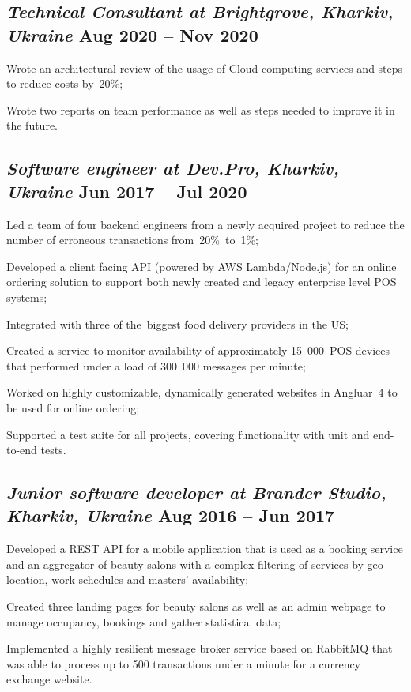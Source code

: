 \documentclass[a4paper,12pt]{book}
\begin{document}
\subsection{{\sl\bf\hspace{0.1in}Technical Consultant at Brightgrove, Kharkiv, Ukraine } \hfill Aug 2020 -- Nov 2020}
\begin{zitemize}
 \item Wrote an architectural review of the usage of Cloud computing services and steps to reduce costs by~20\%;
 \item Wrote two reports on team performance as well as steps needed to improve it in the future.
\end{zitemize}

\subsection{{\sl\bf\hspace{0.1in}Software engineer at Dev.Pro, Kharkiv, Ukraine} \hfill Jun 2017 -- Jul 2020}
\begin{zitemize}
 \item Led a team of four backend engineers from a newly acquired project to reduce the number of erroneous transactions from~20\%~to~1\%;
 \item Developed a client facing API (powered by AWS Lambda/Node.js) for an online ordering solution to support both newly created and legacy enterprise level POS systems;
 \item Integrated with three of the~biggest food delivery providers in the US;
 \item Created a service to monitor availability of approximately 15~000~POS devices that performed under a load of 300~000 messages per minute;
 \item Worked on highly customizable, dynamically generated websites in Angluar~4 to be used for online ordering;
 \item Supported a test suite for all projects, covering functionality with unit and end-to-end tests.
\end{zitemize}

\subsection{{\sl\bf\hspace{0.1in} Junior software developer at Brander Studio, Kharkiv, Ukraine} \hfill Aug 2016 -- Jun 2017}
\begin{zitemize}
 \item Developed a REST API for a mobile application that is used as a booking service and an aggregator of beauty salons with a complex filtering of services by geo location, work schedules and masters' availability;
 \item Created three landing pages for beauty salons as well as an admin webpage to manage occupancy, bookings and gather statistical data;
 \item Implemented a highly resilient message broker service based on RabbitMQ that was able to process up to 500 transactions under a minute for a currency exchange website.
\end{zitemize}
\end{document}
